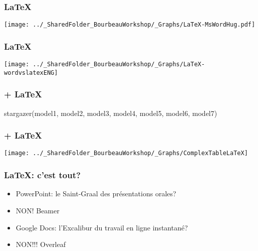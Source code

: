 \documentclass{beamer}
\begin{document}
    \begin{frame}
        \frametitle{\LaTeX} \vspace{1cm}   
        \begin{center}
           \texttt{[image: ../\_SharedFolder\_BourbeauWorkshop/\_Graphs/LaTeX-MsWordHug.pdf]}
        \end{center}  
    \end{frame}

    \begin{frame}
        \frametitle{\LaTeX} \vspace{1cm}
        \begin{center}
           \texttt{[image: ../\_SharedFolder\_BourbeauWorkshop/\_Graphs/LaTeX-wordvslatexENG]}
        \end{center} 
    \end{frame}
 
    \begin{frame}[fragile=singleslide]
        \frametitle{\R + \LaTeX} \vspace{0.5cm} 
        \begin{code}
stargazer(model1, model2, model3, model4, model5, model6, model7)
        \end{code}
    \end{frame}   

    \begin{frame}
        \frametitle{\R + \LaTeX} \vspace{1cm}   
        \begin{center}
           \texttt{[image: ../\_SharedFolder\_BourbeauWorkshop/\_Graphs/ComplexTableLaTeX]}
        \end{center}  
    \end{frame}

  \begin{frame}
        \frametitle{\LaTeX: c'est tout?} \vspace{1cm}  
        \begin{itemize}
            \item<2-> PowerPoint: le Saint-Graal des présentations orales?
            \item<3-> NON! Beamer
            \item<4-> Google Docs: l'Excalibur du travail en ligne instantané?
            \item<5-> NON!!! Overleaf
        \end{itemize}
    \end{frame}
\end{document}

